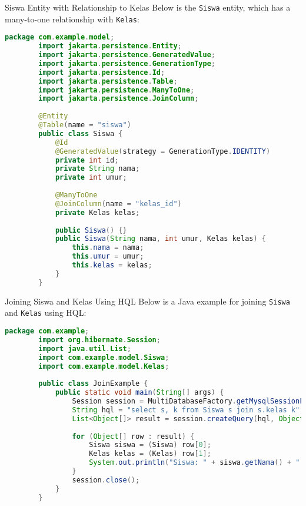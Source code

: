 \documentclass[aspectratio=169, table]{beamer}
\begin{document}
\begin{frame}[fragile]{Siswa Entity with Relationship to Kelas}
	\vspace{20pt}
	Below is the \texttt{Siswa} entity, which has a many-to-one relationship with \texttt{Kelas}:
	
	\begin{lstlisting}[language=Java, style=JavaStyle]
		package com.example.model;
		import jakarta.persistence.Entity;
		import jakarta.persistence.GeneratedValue;
		import jakarta.persistence.GenerationType;
		import jakarta.persistence.Id;
		import jakarta.persistence.Table;
		import jakarta.persistence.ManyToOne;
		import jakarta.persistence.JoinColumn;
		
		@Entity
		@Table(name = "siswa")
		public class Siswa {
			@Id
			@GeneratedValue(strategy = GenerationType.IDENTITY)
			private int id;
			private String nama;
			private int umur;
			
			@ManyToOne
			@JoinColumn(name = "kelas_id")
			private Kelas kelas;
			
			public Siswa() {}
			public Siswa(String nama, int umur, Kelas kelas) {
				this.nama = nama;
				this.umur = umur;
				this.kelas = kelas;
			}
		}
	\end{lstlisting}
\end{frame}

\begin{frame}[fragile]{Joining Siswa and Kelas Using HQL}
	\vspace{20pt}
	Below is a Java example for joining \texttt{Siswa} and \texttt{Kelas} using HQL:
	
	\begin{lstlisting}[language=Java, style=JavaStyle]
		package com.example;
		import org.hibernate.Session;
		import java.util.List;
		import com.example.model.Siswa;
		import com.example.model.Kelas;
		
		public class JoinExample {
			public static void main(String[] args) {
				Session session = MultiDatabaseFactory.getMysqlSessionFactory().openSession();
				String hql = "select s, k from Siswa s join s.kelas k";
				List<Object[]> result = session.createQuery(hql, Object[].class).list();
				
				for (Object[] row : result) {
					Siswa siswa = (Siswa) row[0];
					Kelas kelas = (Kelas) row[1];
					System.out.println("Siswa: " + siswa.getNama() + " | Kelas: " + kelas.getNamaKelas());
				}
				session.close();
			}
		}
	\end{lstlisting}
\end{frame}
\end{document}
